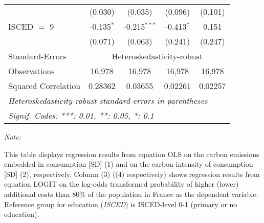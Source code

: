 \begin{table}[htbp!]
\begin{adjustbox}{width = 1\textwidth, max height = 0.95\textheight, center}
\begin{threeparttable}[b]
\begin{tabular}{lcccc}
                                 & (0.030)            & (0.035)            & (0.096)        & (0.101)\\   
            ISCED $=$ 9          & -0.135$^{*}$       & -0.215$^{***}$     & -0.413$^{*}$   & 0.151\\   
                                 & (0.071)            & (0.063)            & (0.241)        & (0.247)\\   
            \midrule 
            Standard-Errors & \multicolumn{4}{c}{Heteroskedasticity-robust} \\ 
            Observations         & 16,978             & 16,978             & 16,978         & 16,978\\  
            Squared Correlation  & 0.28362            & 0.03655            & 0.02261        & 0.02257\\  
            \midrule \midrule
            \multicolumn{5}{l}{\emph{Heteroskedasticity-robust standard-errors in parentheses}}\\
            \multicolumn{5}{l}{\emph{Signif. Codes: ***: 0.01, **: 0.05, *: 0.1}}\\
         \end{tabular}
         
         \begin{tablenotes}\item \medskip \textit{Note:}
            \item This table displays regression results from equation OLS on the carbon emissions embedded in consumption [SD] (1) and on the carbon intensity of consumption [SD] (2), respectively. 
                                      Column (3) ((4) respectively) shows regression results from equation LOGIT on the log-odds transformed probability of higher (lower) additional costs than 80\% of the population in France as the dependent variable. Reference group for education (\textit{ISCED}) is ISCED-level 0-1 (primary or no education).
         \end{tablenotes}
      \end{threeparttable}
   \end{adjustbox}
\end{table}


